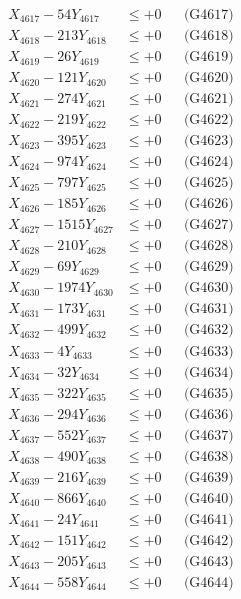 \documentclass[a4paper,10pt]{article}
\begin{document}
{\begin{align}
X_{4617} - 54Y_{4617} &\leq +0 && \text{(G4617)} \\
X_{4618} - 213Y_{4618} &\leq +0 && \text{(G4618)} \\
X_{4619} - 26Y_{4619} &\leq +0 && \text{(G4619)} \\
X_{4620} - 121Y_{4620} &\leq +0 && \text{(G4620)} \\
\allowbreak
X_{4621} - 274Y_{4621} &\leq +0 && \text{(G4621)} \\
X_{4622} - 219Y_{4622} &\leq +0 && \text{(G4622)} \\
X_{4623} - 395Y_{4623} &\leq +0 && \text{(G4623)} \\
X_{4624} - 974Y_{4624} &\leq +0 && \text{(G4624)} \\
X_{4625} - 797Y_{4625} &\leq +0 && \text{(G4625)} \\
X_{4626} - 185Y_{4626} &\leq +0 && \text{(G4626)} \\
X_{4627} - 1515Y_{4627} &\leq +0 && \text{(G4627)} \\
X_{4628} - 210Y_{4628} &\leq +0 && \text{(G4628)} \\
X_{4629} - 69Y_{4629} &\leq +0 && \text{(G4629)} \\
X_{4630} - 1974Y_{4630} &\leq +0 && \text{(G4630)} \\
\allowbreak
X_{4631} - 173Y_{4631} &\leq +0 && \text{(G4631)} \\
X_{4632} - 499Y_{4632} &\leq +0 && \text{(G4632)} \\
X_{4633} - 4Y_{4633} &\leq +0 && \text{(G4633)} \\
X_{4634} - 32Y_{4634} &\leq +0 && \text{(G4634)} \\
X_{4635} - 322Y_{4635} &\leq +0 && \text{(G4635)} \\
X_{4636} - 294Y_{4636} &\leq +0 && \text{(G4636)} \\
X_{4637} - 552Y_{4637} &\leq +0 && \text{(G4637)} \\
X_{4638} - 490Y_{4638} &\leq +0 && \text{(G4638)} \\
X_{4639} - 216Y_{4639} &\leq +0 && \text{(G4639)} \\
X_{4640} - 866Y_{4640} &\leq +0 && \text{(G4640)} \\
\allowbreak
X_{4641} - 24Y_{4641} &\leq +0 && \text{(G4641)} \\
X_{4642} - 151Y_{4642} &\leq +0 && \text{(G4642)} \\
X_{4643} - 205Y_{4643} &\leq +0 && \text{(G4643)} \\
X_{4644} - 558Y_{4644} &\leq +0 && \text{(G4644)} \\

\end{align}}
\end{document}
